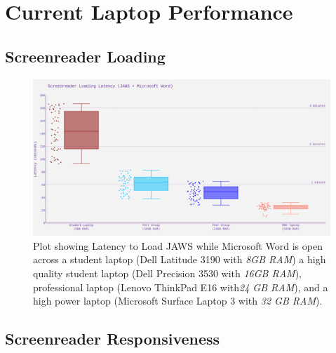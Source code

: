 \documentclass[14pt,letterpaper,twoside]{extreport}
\begin{document}
\pagebreak \hypertarget{current-laptop-performance-measured}{%
	\section{Current Laptop Performance}\label{current-laptop-performance-measured}}

\hypertarget{screenreader-loading}{%
	\subsection{Screenreader Loading}\label{screenreader-loading}}
\begin{figure}[!h]
	\centering
	\includegraphics[width=\textwidth]{images/ComputerRBDisplaySpecsTVIFig1.png}
	\caption[Latency to Load JAWS]{Plot showing Latency to Load JAWS while Microsoft Word is open across a student laptop (Dell Latitude 3190 with \textit{8GB RAM}) a high quality student laptop (Dell Precision 3530 with \textit{16GB RAM}), professional laptop (Lenovo ThinkPad E16 with\textit{24 GB RAM}), and a high power laptop (Microsoft Surface Laptop 3 with \textit{32 GB RAM}).}
	\label{fig:figure 1}
\end{figure}

\pagebreak
\pagebreak
\hypertarget{screenreader-response}{%
	\subsection{Screenreader Responsiveness}\label{screenreader-response}}
\end{document}
